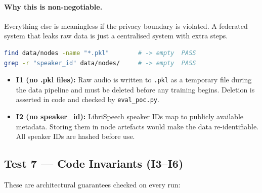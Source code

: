 \documentclass[11pt,a4paper]{article}
\theoremstyle{definition}
\begin{document}
\paragraph{Why this is non-negotiable.}
Everything else is meaningless if the privacy boundary is violated.  A federated
system that leaks raw data is just a centralised system with extra steps.

\begin{lstlisting}[language=bash,caption={Sovereignty checks run by
\texttt{eval\_poc.py}}]
find data/nodes -name "*.pkl"        # -> empty  PASS
grep -r "speaker_id" data/nodes/     # -> empty  PASS
\end{lstlisting}

\begin{itemize}[leftmargin=*]
  \item \textbf{I1 (no .pkl files):} Raw audio is written to \texttt{.pkl} as a
        temporary file during the data pipeline and must be deleted before any
        training begins.  Deletion is asserted in code and checked by
        \texttt{eval\_poc.py}.
  \item \textbf{I2 (no speaker\_id):} LibriSpeech speaker IDs map to publicly
        available metadata.  Storing them in node artefacts would make the data
        re-identifiable.  All speaker IDs are hashed before use.
\end{itemize}

\subsection{Test 7 — Code Invariants (I3--I6)}

These are architectural guarantees checked on every run:
\end{document}
